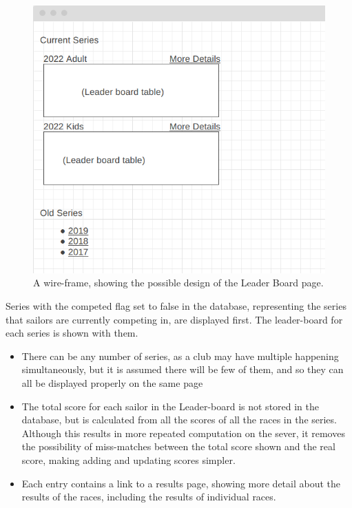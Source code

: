 \documentclass{l4proj}
\begin{document}
\begin{figure}[H]
    \centering
    \includegraphics[width=1\linewidth]{images/IndexWireframe.png} 

    \caption{A wire-frame, showing the possible design of the Leader Board page.
    }

    \label{fig:LeaderBoardWF}
\end{figure}


Series with the competed flag set to false in the database, representing the series that sailors are currently competing in, are displayed first. The leader-board for each series is shown with them.
\begin{itemize}
    \item
    There can be any number of series, as a club may have multiple happening simultaneously, but it is assumed there will be few of them, and so they can all be displayed properly on the same page
    \item
    The total score for each sailor in the Leader-board is not stored in the database, but is calculated from all the scores of all the races in the series. Although this results in more repeated computation on the sever, it removes the possibility of miss-matches between the total score shown and the real score, making adding and updating scores simpler.
    \item
    Each entry contains a link to a results page, showing more detail about the results of the races, including the results of individual races.
\end{itemize}
    
\end{document}
